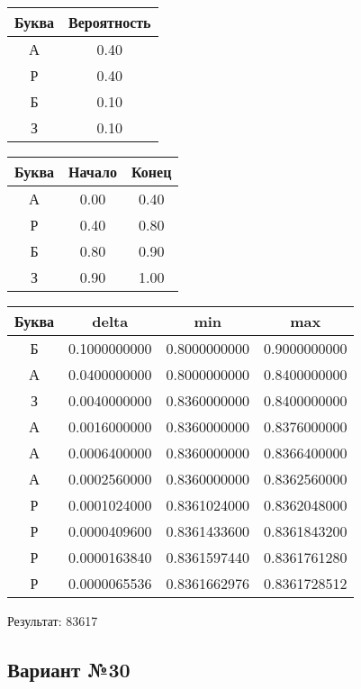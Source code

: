 \documentclass[a4paper, 12pt]{article}
\begin{document}
\begin{center}
 \begin{tabular}{ |c|c| } 
  \hline
     Буква & Вероятность \\ \hline
А & 0.40\\\hline
Р & 0.40\\\hline
Б & 0.10\\\hline
З & 0.10
\\ \hline \end{tabular}
\end{center}
\begin{center}
 \begin{tabular}{ |c|c|c| } 
  \hline
     Буква & Начало & Конец \\ \hline
А & 0.00 & 0.40\\\hline
Р & 0.40 & 0.80\\\hline
Б & 0.80 & 0.90\\\hline
З & 0.90 & 1.00
\\ \hline \end{tabular}
\end{center}
\begin{center}
 \begin{tabular}{ |c|c|c|c| } 
  \hline
     Буква & delta & min & max \\ \hline
Б & 0.1000000000 & 0.8000000000 & 0.9000000000\\\hline
А & 0.0400000000 & 0.8000000000 & 0.8400000000\\\hline
З & 0.0040000000 & 0.8360000000 & 0.8400000000\\\hline
А & 0.0016000000 & 0.8360000000 & 0.8376000000\\\hline
А & 0.0006400000 & 0.8360000000 & 0.8366400000\\\hline
А & 0.0002560000 & 0.8360000000 & 0.8362560000\\\hline
Р & 0.0001024000 & 0.8361024000 & 0.8362048000\\\hline
Р & 0.0000409600 & 0.8361433600 & 0.8361843200\\\hline
Р & 0.0000163840 & 0.8361597440 & 0.8361761280\\\hline
Р & 0.0000065536 & 0.8361662976 & 0.8361728512
\\ \hline \end{tabular}
\end{center}
Результат: 83617
\pagebreak
\subsection{Вариант №30}
\end{document}

